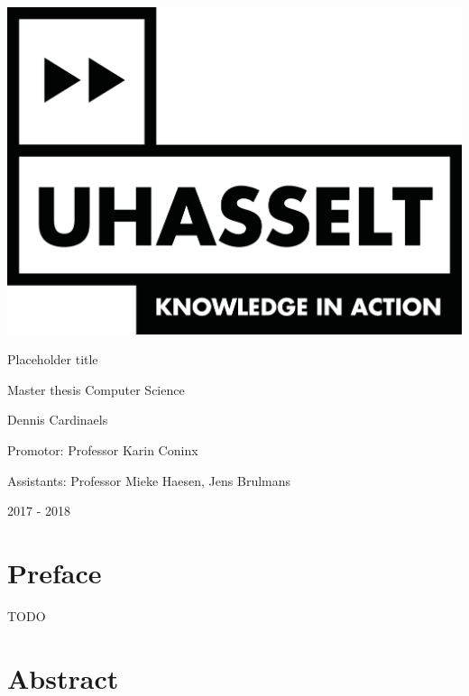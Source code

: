 \documentclass{article}
\begin{document}
	\begin{titlepage}

		\centering
		
		
		\includegraphics[scale=0.5]{logo_uhasselt}		
		\vspace{1cm}
		
		\Huge Placeholder title
		\vspace{0.4cm}
		
		\large Master thesis Computer Science
		\vspace{1cm}
		
		\LARGE Dennis Cardinaels
		\vspace{1cm}
		
		\large Promotor: Professor Karin Coninx
		\vspace{0.2cm}
		
		Assistants: Professor Mieke Haesen, Jens Brulmans
		
		\vspace{1.2cm}
		
		
		\Large 2017 - 2018
		
	\end{titlepage}

	\cleardoublepage
	\section*{Preface}

	TODO
	
	\newpage
	\section*{Abstract}
	
\end{document}
